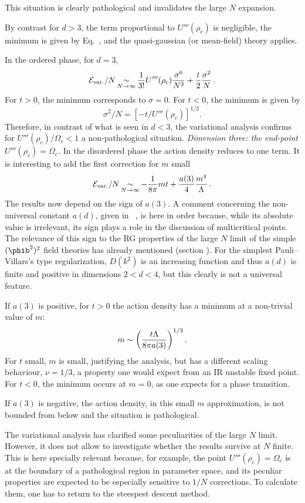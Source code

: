 This situation is clearly pathological and invalidates the large $N$ expansion. \par
By contrast for $d>3$, the term proportional to $U'''(\rho _c)$ is negligible,
the minimum is given by Eq.~\emsq, and the quasi-gaussian (or mean-field) theory applies.
\par
In the ordered phase, for $d=3$,
$$ {\cal E}_{\rm var.}/N\mathop{\sim}_{N\to \infty }
  {1\over3!}U'''(\rho _c){\sigma ^6\over N^3}+{t\over2}{\sigma ^2\over N}\,.$$
For $t>0$, the minimum corresponds to $\sigma =0$. For $t<0$,
the minimum is given by
$$\sigma ^2/N=[-t /U'''(\rho _c)]^{1/2}.$$
Therefore, in contrast of what is seen in $d<3$, the variational analysis confirms
for $U'''(\rho _c)/ \Omega _c<1$ a non-pathological situation.
\smallskip
{\it Dimension three: the end-point $U'''(\rho _c)=\Omega _c$.}
In the disordered phase the action density reduces to one term. It is interesting to add the first correction for $m$ small
$$ {\cal E}_{\rm var.}/N\mathop{\sim}_{N\to \infty }  -{1\over8\pi}m t
+{a(3)\over 4}{m^4 \over \Lambda }\,.$$
The results now depend on
the sign of $a(3)$. A comment concerning the non-universal
constant $a(d)$, given in \eadef\ , is here in order because,
while its absolute value is irrelevant, its sign plays a role in
the discussion of multicritical points. The relevance of this sign
to the RG properties of the large $N$ limit of the simple
$(\phib^2)^2$ field theories has already mentioned (section
\sssEGRN). For the simplest Pauli--Villars's type regularization,
 $D(k^2) $ is an increasing function and thus $a(d)$ is
finite and positive in dimensions $2 < d < 4$, but this clearly is
not a universal feature.\par
 If $a(3)$ is positive, for $t>0$ the
action density has a minimum at a non-trivial value of $m$:
$$ m\sim \left(t\Lambda \over 8\pi a(3)\right)^{1/3}.$$
For $t$ small, $m$ is small, justifying the analysis, but has a different scaling behaviour, $\nu =1/3$, a property one would expect from an IR unstable fixed point.
For $t<0$, the minimum occurs at $m=0$, as one expects for a phase transition.\par
If $a(3)$ is negative, the action density, in this small $m$ approximation, is not bounded from below and the situation is pathological.
\par
The variational analysis has clarified some peculiarities of the large $N$ limit. However, it does not allow to investigate whether the results survive at $N$ finite.
This is here specially relevant because, for example, the  point $U'''(\rho _c)=\Omega _c$ is at the boundary of a pathological region in parameter space, and its peculiar properties
are expected to be especially sensitive to $1/N$ corrections.
To calculate them, one has to return to the steespest descent method.

